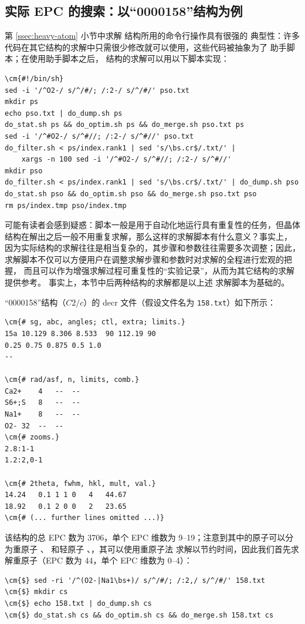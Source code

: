 \subsection{实际 EPC 的搜索：以“0000158”结构为例}\label{ssec:epc-search}

第 \ref{ssec:heavy-atom} 小节中求解  结构所用的命令行操作具有很强的
典型性：许多代码在其它结构的求解中只需很少修改就可以使用，这些代码被抽象为了
助手脚本；在使用助手脚本之后， 结构的求解可以用以下脚本实现：
\begin{Verbatim}
\cm{#!/bin/sh}
sed -i '/^O2-/ s/^/#/; /:2-/ s/^/#/' pso.txt
mkdir ps
echo pso.txt | do_dump.sh ps
do_stat.sh ps && do_optim.sh ps && do_merge.sh pso.txt ps
sed -i '/^#O2-/ s/^#//; /:2-/ s/^#//' pso.txt
do_filter.sh < ps/index.rank1 | sed 's/\bs.cr$/.txt/' |
	xargs -n 100 sed -i '/^#O2-/ s/^#//; /:2-/ s/^#//'
mkdir pso
do_filter.sh < ps/index.rank1 | sed 's/\bs.cr$/.txt/' | do_dump.sh pso
do_stat.sh pso && do_optim.sh pso && do_merge.sh pso.txt pso
rm ps/index.tmp pso/index.tmp
\end{Verbatim}
可能有读者会感到疑惑：脚本一般是用于自动化地运行具有重复性的任务，但晶体
结构在解出之后一般不用重复求解，那么这样的求解脚本有什么意义？事实上，
因为实际结构的求解往往是相当复杂的，其步骤和参数往往需要多次调整；因此，
求解脚本不仅可以方便用户在调整求解步骤和参数时对求解的全程进行宏观的把握，
而且可以作为增强求解过程可重复性的“实验记录”，从而为其它结构的求解提供参考。
事实上，本节中后两种结构的求解都是以上述  求解脚本为基础的。

“0000158”结构（$C2/c$）的 decr 文件（假设文件名为 \verb|158.txt|）如下所示：
\begin{Verbatim}
\cm{# sg, abc, angles; ctl, extra; limits.}
15a	10.129 8.306 8.533	90 112.19 90
0.25 0.75 0.875	0.5 1.0
--

\cm{# rad/asf, n, limits, comb.}
Ca2+	4	--	--
S6+;S	8	--	--
Na1+	8	--	--
O2-	32	--	--
\cm{# zooms.}
2.8:1-1
1.2:2,0-1

\cm{# 2theta, fwhm, hkl, mult, val.}
14.24	0.1	1 1 0	4	44.67
18.92	0.1	2 0 0	2	23.65
\cm{# (... further lines omitted ...)}
\end{Verbatim}
该结构的总 EPC 数为 3706，单个 EPC 维数为 9--19；注意到其中的原子可以分为重原子
、 和轻原子 、，其可以使用重原子法
求解以节约时间，因此我们首先求解重原子（EPC 数为 44，单个 EPC 维数为 0--4）：
\begin{Verbatim}
\cm{$} sed -ri '/^(O2-|Na1\bs+)/ s/^/#/; /:2,/ s/^/#/' 158.txt
\cm{$} mkdir cs
\cm{$} echo 158.txt | do_dump.sh cs
\cm{$} do_stat.sh cs && do_optim.sh cs && do_merge.sh 158.txt cs
\end{Verbatim}

